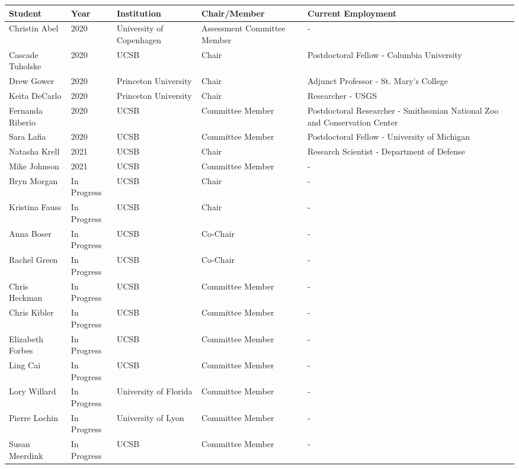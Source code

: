 
\begin{longtable}{lp{1.5cm} p{4.5cm}p{2cm}p{4cm}}
Student & Year & Institution & Chair/Member & Current Employment\\
\hline 
\endhead 
Christin Abel & 2020 & University of Copenhagen & Assessment Committee Member &   -   \\
Cascade Tuholske & 2020 & UCSB & Chair & Postdoctoral Fellow  -  Columbia University \\
Drew Gower & 2020 & Princeton University & Chair & Adjunct Professor  -  St. Mary's College \\
Keita DeCarlo & 2020 & Princeton University & Chair & Researcher  -  USGS \\
Fernanda Riberio & 2020 & UCSB & Committee Member & Postdoctoral Researcher  -  Smithsonian National Zoo and Conservation Center \\
Sara Lafia & 2020 & UCSB & Committee Member & Postdoctoral Fellow  -  University of Michigan \\
Natasha Krell & 2021 & UCSB & Chair & Research Scientist  -  Department of Defense \\
Mike Johnson & 2021 & UCSB & Committee Member &   -   \\
Bryn Morgan & In Progress & UCSB & Chair &   -   \\
Kristina Fauss & In Progress & UCSB & Chair &   -   \\
Anna Boser & In Progress & UCSB & Co-Chair &   -   \\
Rachel Green & In Progress & UCSB & Co-Chair &   -   \\
Chris Heckman & In Progress & UCSB & Committee Member &   -   \\
Chris Kibler & In Progress & UCSB & Committee Member &   -   \\
Elizabeth Forbes & In Progress & UCSB & Committee Member &   -   \\
Ling Cai & In Progress & UCSB & Committee Member &   -   \\
Lory Willard & In Progress & University of Florida & Committee Member &   -   \\
Pierre Lochin & In Progress & University of Lyon & Committee Member &   -   \\
Susan Meerdink & In Progress & UCSB & Committee Member &   -   \\
\end{longtable}

